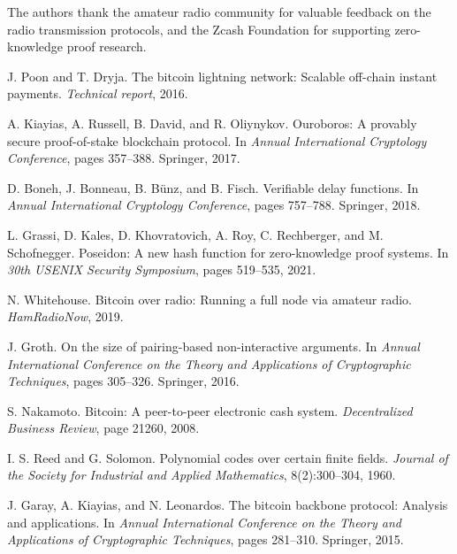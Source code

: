\documentclass[11pt,a4paper]{article}
\begin{document}
The authors thank the amateur radio community for valuable feedback on the radio transmission protocols, and the Zcash Foundation for supporting zero-knowledge proof research.

\begin{thebibliography}{99}

J. Poon and T. Dryja.
\newblock The bitcoin lightning network: Scalable off-chain instant payments.
\newblock \emph{Technical report}, 2016.

A. Kiayias, A. Russell, B. David, and R. Oliynykov.
\newblock Ouroboros: A provably secure proof-of-stake blockchain protocol.
\newblock In \emph{Annual International Cryptology Conference}, pages 357--388. Springer, 2017.

D. Boneh, J. Bonneau, B. Bünz, and B. Fisch.
\newblock Verifiable delay functions.
\newblock In \emph{Annual International Cryptology Conference}, pages 757--788. Springer, 2018.

L. Grassi, D. Kales, D. Khovratovich, A. Roy, C. Rechberger, and M. Schofnegger.
\newblock Poseidon: A new hash function for zero-knowledge proof systems.
\newblock In \emph{30th USENIX Security Symposium}, pages 519--535, 2021.

N. Whitehouse.
\newblock Bitcoin over radio: Running a full node via amateur radio.
\newblock \emph{HamRadioNow}, 2019.

J. Groth.
\newblock On the size of pairing-based non-interactive arguments.
\newblock In \emph{Annual International Conference on the Theory and Applications of Cryptographic Techniques}, pages 305--326. Springer, 2016.

S. Nakamoto.
\newblock Bitcoin: A peer-to-peer electronic cash system.
\newblock \emph{Decentralized Business Review}, page 21260, 2008.

I. S. Reed and G. Solomon.
\newblock Polynomial codes over certain finite fields.
\newblock \emph{Journal of the Society for Industrial and Applied Mathematics}, 8(2):300--304, 1960.

J. Garay, A. Kiayias, and N. Leonardos.
\newblock The bitcoin backbone protocol: Analysis and applications.
\newblock In \emph{Annual International Conference on the Theory and Applications of Cryptographic Techniques}, pages 281--310. Springer, 2015.


\end{thebibliography}
\end{document}
